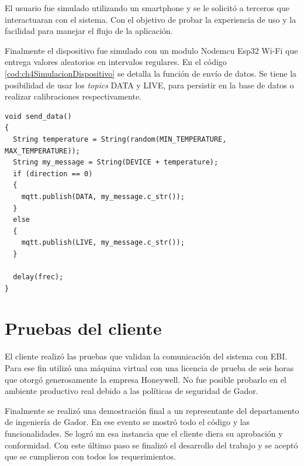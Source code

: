 El usuario fue simulado utilizando un smartphone y se le solicitó a terceros que interactuaran con el sistema.
Con el objetivo de probar la experiencia de uso y la facilidad para manejar el flujo de la aplicación.

Finalmente el dispositivo fue simulado con un modulo Nodemcu Esp32 Wi-Fi que entrega valores aleatorios en intervalos regulares.
En el código \ref{cod:ch4SimulacionDispositivo} se detalla la función de envío de datos.
Se tiene la posibilidad de usar los \emph{topics} DATA y LIVE, para persistir en la base de datos o realizar calibraciones respectivamente.

\begin{lstlisting}[label=cod:ch4SimulacionDispositivo,caption=Función de envío de datos.]
void send_data()
{
  String temperature = String(random(MIN_TEMPERATURE, MAX_TEMPERATURE));
  String my_message = String(DEVICE + temperature);
  if (direction == 0)
  {
    mqtt.publish(DATA, my_message.c_str());
  }
  else
  {
    mqtt.publish(LIVE, my_message.c_str());
  }

  delay(frec);
}
\end{lstlisting}

\section{Pruebas del cliente}

El cliente realizó las pruebas que validan la comunicación del sistema con EBI.
Para ese fin utilizó una máquina virtual con una licencia de prueba de seis horas que otorgó generosamente la empresa Honeywell.
No fue posible probarlo en el ambiente productivo real debido a las políticas de seguridad de Gador.

Finalmente se realizó una demostración final a un representante del departamento de ingeniería de Gador.
En ese evento se mostró todo el código y las funcionalidades.
Se logró nn esa instancia que el cliente diera su aprobación y conformidad.
Con este último paso se finalizó el desarrollo del trabajo y se aceptó que se cumplieron con todos los requerimientos.
